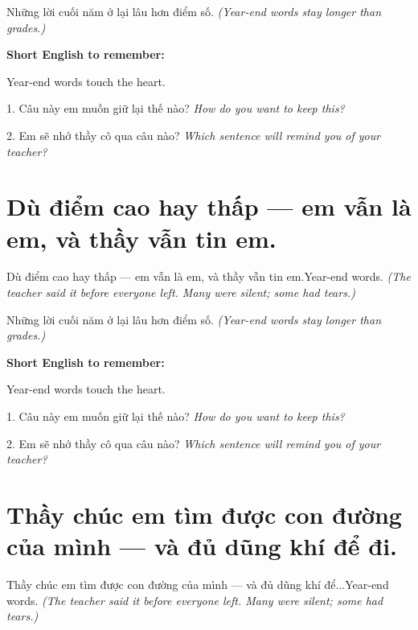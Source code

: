 \begin{baihoc}
Những lời cuối năm ở lại lâu hơn điểm số.
\textit{(Year-end words stay longer than grades.)}
\end{baihoc}

\begin{ghinhoanh}
\textbf{Short English to remember:}

Year-end words touch the heart.

\end{ghinhoanh}

\begin{tuhocnhanh}
1. Câu này em muốn giữ lại thế nào? \textit{How do you want to keep this?}

2. Em sẽ nhớ thầy cô qua câu nào? \textit{Which sentence will remind you of your teacher?}
\end{tuhocnhanh}
\ngancach


\section{Dù điểm cao hay thấp — em vẫn là em, và thầy vẫn tin em.}
\begin{truyen}{Dù điểm cao hay thấp — em vẫn là em, và thầy vẫn tin em.}{Year-end words.}
\textit{(The teacher said it before everyone left. Many were silent; some had tears.)}
\end{truyen}

\begin{baihoc}
Những lời cuối năm ở lại lâu hơn điểm số.
\textit{(Year-end words stay longer than grades.)}
\end{baihoc}

\begin{ghinhoanh}
\textbf{Short English to remember:}

Year-end words touch the heart.

\end{ghinhoanh}

\begin{tuhocnhanh}
1. Câu này em muốn giữ lại thế nào? \textit{How do you want to keep this?}

2. Em sẽ nhớ thầy cô qua câu nào? \textit{Which sentence will remind you of your teacher?}
\end{tuhocnhanh}
\ngancach


\section{Thầy chúc em tìm được con đường của mình — và đủ dũng khí để đi.}
\begin{truyen}{Thầy chúc em tìm được con đường của mình — và đủ dũng khí để...}{Year-end words.}
\textit{(The teacher said it before everyone left. Many were silent; some had tears.)}
\end{truyen}

